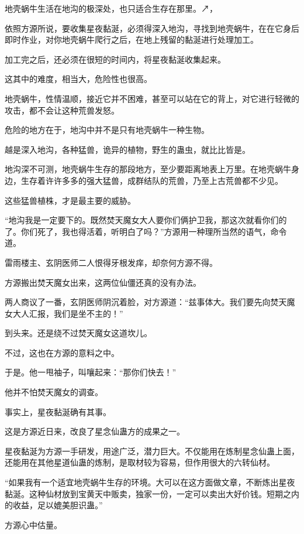 
\begin{this_body}

地壳蜗牛生活在地沟的极深处，也只适合生存在那里。↗，

依照方源所说，要收集星夜黏涎，必须得深入地沟，寻找到地壳蜗牛，在在它身后即时作业，对你地壳蜗牛爬行之后，在地上残留的黏涎进行处理加工。

加工完之后，还必须在很短的时间内，将星夜黏涎收集起来。

这其中的难度，相当大，危险性也很高。

地壳蜗牛，性情温顺，接近它并不困难，甚至可以站在它的背上，对它进行轻微的攻击，都不会让这种荒兽发怒。

危险的地方在于，地沟中并不是只有地壳蜗牛一种生物。

越是深入地沟，各种猛兽，诡异的植物，野生的蛊虫，就比比皆是。

地沟深不可测，地壳蜗牛生存的那段地方，至少要距离地表上万里。在地壳蜗牛身边，生存着许许多多的强大猛兽，成群结队的荒兽，乃至上古荒兽都不少见。

这些猛兽植株，才是最主要的威胁。

“地沟我是一定要下的。既然焚天魔女大人要你们俩护卫我，那这次就看你们的了。你们死了，我也得活着，听明白了吗？”方源用一种理所当然的语气，命令道。

雷雨楼主、玄阴医师二人恨得牙根发痒，却奈何方源不得。

方源搬出焚天魔女出来，这两位仙僵还真的没有办法。

两人商议了一番，玄阴医师阴沉着脸，对方源道：“兹事体大。我们要先向焚天魔女大人汇报，我们是坐不主的！”

到头来。还是绕不过焚天魔女这道坎儿。

不过，这也在方源的意料之中。

于是。他一甩袖子，叫嚷起来：“那你们快去！”

他并不怕焚天魔女的调查。

事实上，星夜黏涎确有其事。

这是方源近日来，改良了星念仙蛊方的成果之一。

星夜黏涎为方源一手研发，用途广泛，潜力巨大。不仅能用在炼制星念仙蛊上面，还能用在其他星道仙蛊的炼制，是取材较为容易，但作用很大的六转仙材。

“如果我有一个适宜地壳蜗牛生存的环境。大可以在这方面做文章，不断炼出星夜黏涎。这种仙材放到宝黄天中贩卖，独家一份，一定可以卖出大好价钱。短期之内的收益，足以媲美胆识蛊。”

方源心中估量。


\end{this_body}
